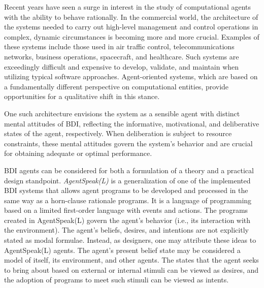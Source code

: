 \vspace{.5cm}

Recent years have seen a surge in interest in the study of computational agents with the ability to behave rationally. In the commercial world, the architecture of the systems needed to carry out high-level management and control operations in complex, dynamic circumstances is becoming more and more crucial. Examples of these systems include those used in air traffic control, telecommunications networks, business operations, spacecraft, and healthcare. Such systems are exceedingly difficult and expensive to develop, validate, and maintain when utilizing typical software approaches. Agent-oriented systems, which are based on a fundamentally different perspective on computational entities, provide opportunities for a qualitative shift in this stance. 

\vspace{.5cm}

One such architecture envisions the system as a sensible agent with distinct mental attitudes of \ac{BDI}, reflecting the informative, motivational, and deliberative states of the agent, respectively. When deliberation is subject to resource constraints, these mental attitudes govern the system's behavior and are crucial for obtaining adequate or optimal performance.

\vspace{.5cm}

\ac{BDI} agents can be considered for both a formulation of a theory and a practical design standpoint. \textit{AgentSpeak(L)} is a generalization of one of the implemented \ac{BDI} systems that allows agent programs to be developed and processed in the same way as a horn-clause rationale programs. It is a language of programming based on a limited first-order language with events and actions. The programs created in AgentSpeak(L) govern the agent's behavior (i.e., its interaction with the environment). The agent's beliefs, desires, and intentions are not explicitly stated as modal formulae. Instead, as designers, one may attribute these ideas to AgentSpeak(L) agents. The agent's present belief state may be considered a model of itself, its environment, and other agents. The states that the agent seeks to bring about based on external or internal stimuli can be viewed as desires, and the adoption of programs to meet such stimuli can be viewed as intents.

\vspace{.5cm}

